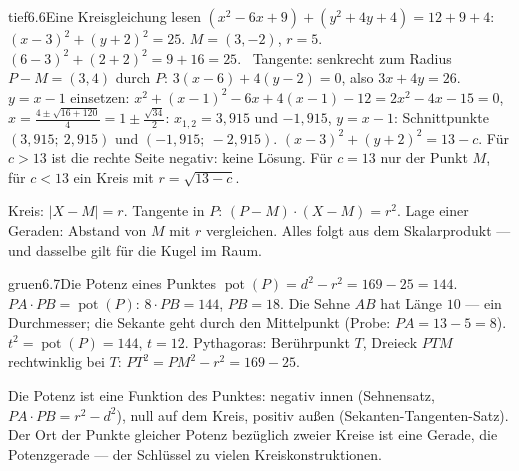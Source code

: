 \begin{loesungkarte}{tief}{6.6}{Eine Kreisgleichung lesen}
$(x^{2} - 6x + 9) + (y^{2} + 4y + 4) = 12 + 9 + 4$: $(x - 3)^{2} + (y + 2)^{2} = 25$. $M = (3, -2)$, $r = 5$.
$(6 - 3)^{2} + (2 + 2)^{2} = 9 + 16 = 25$. \checkmark\ Tangente: senkrecht zum Radius $P - M = (3, 4)$ durch $P$: $3(x - 6) + 4(y - 2) = 0$, also $3x + 4y = 26$.
$y = x - 1$ einsetzen: $x^{2} + (x - 1)^{2} - 6x + 4(x - 1) - 12 = 2x^{2} - 4x - 15 = 0$, $x = \frac{4\pm\sqrt{16 + 120}}4 = 1\pm\frac{\sqrt{34}}2$: $x_{1,2} = 3{,}915$ und $-1{,}915$, $y = x - 1$: Schnittpunkte $(3{,}915;\ 2{,}915)$ und $(-1{,}915;\ -2{,}915)$.
$(x - 3)^{2} + (y + 2)^{2} = 13 - c$. Für $c > 13$ ist die rechte Seite negativ: keine Lösung. Für $c = 13$ nur der Punkt $M$, für $c < 13$ ein Kreis mit $r = \sqrt{13 - c}$.
\begin{mitnehmen}\kastentext
Kreis: $|X - M| = r$. Tangente in $P$: $(P - M)\cdot(X - M) = r^{2}$. Lage einer Geraden: Abstand von $M$ mit $r$ vergleichen. Alles folgt aus dem Skalarprodukt --- und dasselbe gilt für die Kugel im Raum.
\end{mitnehmen}
\end{loesungkarte}

\begin{loesungkarte}{gruen}{6.7}{Die Potenz eines Punktes}
$\operatorname{pot}(P) = d^{2} - r^{2} = 169 - 25 = 144$.
$PA\cdot PB = \operatorname{pot}(P)$: $8\cdot PB = 144$, $PB = 18$. Die Sehne $AB$ hat Länge $10$ --- ein Durchmesser; die Sekante geht durch den Mittelpunkt (Probe: $PA = 13 - 5 = 8$). \checkmark
{}
$t^{2} = \operatorname{pot}(P) = 144$, $t = 12$. Pythagoras: Berührpunkt $T$, Dreieck $PTM$ rechtwinklig bei $T$: $PT^{2} = PM^{2} - r^{2} = 169 - 25$. \checkmark
{}
\begin{mitnehmen}\kastentext
Die Potenz ist eine Funktion des Punktes: negativ innen (Sehnensatz, $PA\cdot PB = r^{2} - d^{2}$), null auf dem Kreis, positiv außen (Sekanten-Tangenten-Satz). Der Ort der Punkte gleicher Potenz bezüglich zweier Kreise ist eine Gerade, die Potenzgerade --- der Schlüssel zu vielen Kreiskonstruktionen.
\end{mitnehmen}
\end{loesungkarte}

